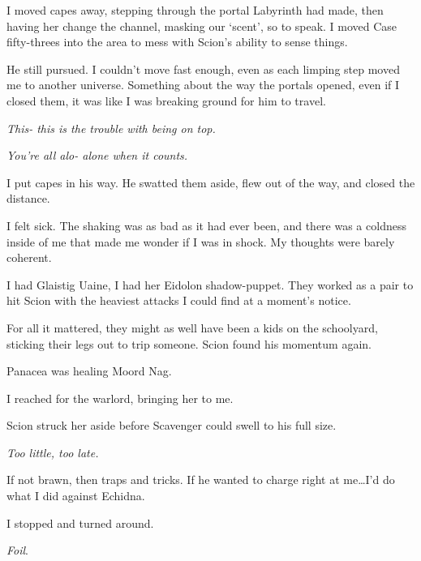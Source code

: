 I moved capes away, stepping through the portal Labyrinth had made, then having her change the channel, masking our `scent', so to speak.  I moved Case fifty-threes into the area to mess with Scion's ability to sense things.



He still pursued.  I couldn't move fast enough, even as each limping step moved me to another universe.  Something about the way the portals opened, even if I closed them, it was like I was breaking ground for him to travel.



\emph{This- this is the trouble with being on top.}



\emph{You're all alo- alone when it counts.}



I put capes in his way.  He swatted them aside, flew out of the way, and closed the distance.



I felt sick.  The shaking was as bad as it had ever been, and there was a coldness inside of me that made me wonder if I was in shock.  My thoughts were barely coherent.



I had Glaistig Uaine, I had her Eidolon shadow-puppet.  They worked as a pair to hit Scion with the heaviest attacks I could find at a moment's notice.



For all it mattered, they might as well have been a kids on the schoolyard, sticking their legs out to trip someone.  Scion found his momentum again.



Panacea was healing Moord Nag.



I reached for the warlord, bringing her to me.



Scion struck her aside before Scavenger could swell to his full size.



\emph{Too little, too late.}



If not brawn, then traps and tricks.  If he wanted to charge right at me\ldots I'd do what I did against Echidna.



I stopped and turned around.



\emph{Foil}.



